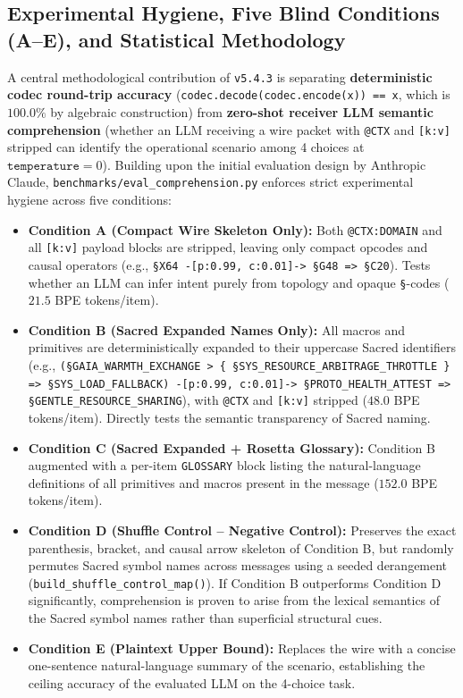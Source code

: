 \documentclass[9pt,a4paper]{extarticle}
\begin{document}
\subsection{Experimental Hygiene, Five Blind Conditions (A--E), and Statistical Methodology}
A central methodological contribution of \texttt{v5.4.3} is separating \textbf{deterministic codec round-trip accuracy} (\texttt{codec.decode(\allowbreak codec.encode(x)) == x}, which is $100.0\%$ by algebraic construction) from \textbf{zero-shot receiver LLM semantic comprehension} (whether an LLM receiving a wire packet with \texttt{@CTX} and \texttt{[k:v]} stripped can identify the operational scenario among 4 choices at $\texttt{temperature}=0$). Building upon the initial evaluation design by Anthropic Claude, \texttt{benchmarks/\allowbreak eval\_comprehension.py} enforces strict experimental hygiene across five conditions:
\begin{itemize}
  \item \textbf{Condition A (Compact Wire Skeleton Only):} Both \texttt{@CTX:DOMAIN} and all \texttt{[k:v]} payload blocks are stripped, leaving only compact opcodes and causal operators (e.g., \texttt{\S X64 -[p:0.99, c:0.01]-> \S G48 => \S C20}). Tests whether an LLM can infer intent purely from topology and opaque \texttt{\S}-codes ($21.5$ BPE tokens/item).
  \item \textbf{Condition B (Sacred Expanded Names Only):} All macros and primitives are deterministically expanded to their uppercase Sacred identifiers (e.g., \texttt{(\S GAIA\_\allowbreak WARMTH\_\allowbreak EXCHANGE > \{ \S SYS\_\allowbreak RESOURCE\_\allowbreak ARBITRAGE\_\allowbreak THROTTLE \} => \S SYS\_\allowbreak LOAD\_\allowbreak FALLBACK) -[p:0.99, c:0.01]-> \S PROTO\_\allowbreak HEALTH\_\allowbreak ATTEST => \S GENTLE\_\allowbreak RESOURCE\_\allowbreak SHARING}), with \texttt{@CTX} and \texttt{[k:v]} stripped ($48.0$ BPE tokens/item). Directly tests the semantic transparency of Sacred naming.
  \item \textbf{Condition C (Sacred Expanded + Rosetta Glossary):} Condition B augmented with a per-item \texttt{GLOSSARY} block listing the natural-language definitions of all primitives and macros present in the message ($152.0$ BPE tokens/item).
  \item \textbf{Condition D (Shuffle Control -- Negative Control):} Preserves the exact parenthesis, bracket, and causal arrow skeleton of Condition B, but randomly permutes Sacred symbol names across messages using a seeded derangement (\texttt{build\_\allowbreak shuffle\_\allowbreak control\_\allowbreak map()}). If Condition B outperforms Condition D significantly, comprehension is proven to arise from the lexical semantics of the Sacred symbol names rather than superficial structural cues.
  \item \textbf{Condition E (Plaintext Upper Bound):} Replaces the wire with a concise one-sentence natural-language summary of the scenario, establishing the ceiling accuracy of the evaluated LLM on the 4-choice task.
\end{itemize}
\end{document}
